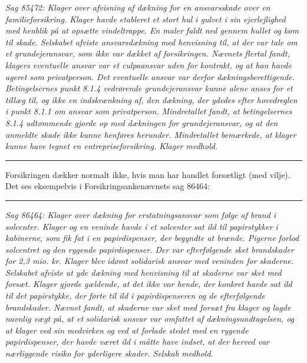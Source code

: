 \documentclass[]{book}
\begin{document}
\emph{Sag 85472: Klager over afvisning af dækning for en ansvarsskade over en familieforsikring. Klager havde etableret et stort hul i gulvet i sin ejerlejlighed med henblik på at opsætte vindeltrappe. En maler faldt ned gennem hullet og kom til skade. Selskabet afviste ansvarsdækning med henvisning til, at der var tale om et grundejeransvar, som ikke var dækket af forsikringen. Nævnets flertal fandt, klagers eventuelle ansvar var et culpaansvar uden for kontrakt, og at han havde ageret som privatperson. Det eventuelle ansvar var derfor dækningsberettigende. Betingelsernes punkt 8.1.4 vedrørende grundejeransvar kunne alene anses for et tillæg til, og ikke en indskrænkning af, den dækning, der ydedes efter hovedreglen i punkt 8.1.1 om ansvar som privatperson. Mindretallet fandt, at betingelsernes 8.1.4 udtømmende gjorde op med dækningen for grundejeransvar, og at den anmeldte skade ikke kunne henføres herunder. Mindretallet bemærkede, at klager kunne have tegnet en entrepriseforsikring. Klager medhold.}

\begin{center}\rule{0.5\linewidth}{\linethickness}\end{center}

Forsikringen dækker normalt ikke, hvis man har handlet forsætligt (med vilje). Det ses eksempelvis i Forsikringsankenævnets sag 86464:

\begin{center}\rule{0.5\linewidth}{\linethickness}\end{center}

\emph{Sag 86464: Klager over dækning for erstatningsansvar som følge af brand i solcenter. Klager og en veninde havde i et solcenter sat ild til papirstykker i kabinerne, som fik fat i en papirdispenser, der begyndte at brænde. Pigerne forlod solcentret og den rygende papirdispenser. Der var efterfølgende sket brandskader for 2,3 mio. kr. Klager blev idømt solidarisk ansvar med veninden for skaderne. Selskabet afviste at yde dækning med henvisning til at skaderne var sket med forsæt. Klager gjorde gældende, at det ikke var hende, der konkret havde sat ild til det papirstykke, der førte til ild i papirdispenseren og de efterfølgende brandskader. Nævnet fandt, at skaderne var sket med forsæt fra klager og lagde navnlig vægt på, at et solidarisk ansvar var omfattet af dækningsundtagelsen, og at klager ved sin medvirken og ved at forlade stedet med en rygende papirdispenser, der havde været ild i måtte have indset, at der herved var nærliggende risiko for yderligere skader. Selskab medhold.}
\end{document}
